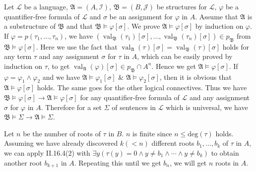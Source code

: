 \documentclass[12pt]{article}
\newcommand{\val}{\mathop{\mathrm{val}}}
\theoremstyle{definition}
\newenvironment{customthm}[1]
  {\renewcommand\theinnercustomthm{#1}\innercustomthm}
  {\endinnercustomthm}
\begin{document}
\begin{customthm}{II.15.4} Let $\mathcal{L}$ be a language, $\mathfrak{A}=(A,\mathcal{I})$, $\mathfrak{B}=(B,\mathcal{J})$ be structures for $\mathcal{L}$, $\varphi$ be a quantifier-free formula of $\mathcal{L}$ and $\sigma$ be an assignment for $\varphi$ in $A$. Assume that $\mathfrak{A}$ is a substructure of $\mathfrak{B}$ and that $\mathfrak{B}\models\varphi[\sigma]$. We prove $\mathfrak{A}\models\varphi[\sigma]$ by induction on $\varphi$. If $\varphi=p(\tau_1,\ldots,\tau_n)$, we have $(\val_{\mathfrak{B}}(\tau_1)[\sigma],\ldots,\val_{\mathfrak{B}}(\tau_n)[\sigma])\in p_\mathfrak{B}$ from $\mathfrak{B}\models\varphi[\sigma]$. Here we use the fact that $\val_{\mathfrak{A}}(\tau)[\sigma]=\val_{\mathfrak{B}}(\tau)[\sigma]$ holds for any term $\tau$ and any assignment $\sigma$ for $\tau$ in $A$, which can be easily proved by induction on $\tau$, to get $\val_{\mathfrak{A}}(\varphi)[\sigma]\in p_\mathfrak{B}\cap A^n$. Hence we get $\mathfrak{A}\models\varphi[\sigma]$. If $\varphi=\varphi_1\wedge\varphi_2$ and we have  $\mathfrak{A}\models\varphi_1[\sigma]$ \& $\mathfrak{A}\models\varphi_2[\sigma]$, then it is obvious that $\mathfrak{A}\models\varphi[\sigma]$ holds. The same goes for the other logical connectives. Thus we have $\mathfrak{B}\models\varphi[\sigma]\rightarrow\mathfrak{A}\models\varphi[\sigma]$ for any quantifier-free formula of $\mathcal{L}$ and any assignment $\sigma$ for $\varphi$ in $A$. Therefore for a set $\Sigma$ of sentences in $\mathcal{L}$ which is universal, we have $\mathfrak{B}\models\Sigma\rightarrow\mathfrak{A}\models\Sigma$.
\end{customthm}

\begin{customthm}{II.16.5} Let $n$ be the number of roots of $\tau$ in $B$. $n$ is finite since $n\leq\textrm{deg}(\tau)$ holds. Assuming we have already discovered $k(<n)$ different roots $b_1,\ldots,b_k$ of $\tau$ in $A$, we can apply II.16.4(2) with $\exists y(\tau(y)=0\wedge y\neq b_1\wedge\cdots\wedge y\neq b_k)$ to obtain another root $b_{k+1}$ in $A$. Repeating this until we get $b_n$, we will get $n$ roots in $A$.
\end{customthm}
\end{document}
